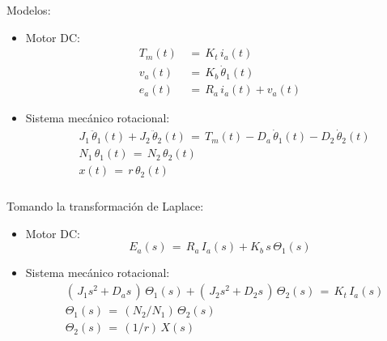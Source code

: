\documentclass[ 10pt, xcolor = dvipsnames]{beamer}
\begin{document}
\begin{frame}[allowframebreaks]
\frametitle{\insertsection}

Modelos: 
\begin{itemize}
\item Motor DC: 
\begin{align*}
T_m(t) \, & = \, K_t \, i_a(t) \\[1ex]
v_a(t) \, & = \, K_b \, \dot{\theta}_1(t) \\[1ex]
e_a(t) \, & = \, R_a \, i_a(t) + v_a(t)
\end{align*}
\item Sistema mec\'anico rotacional: 
\begin{align*}
& J_1 \, \ddot{\theta}_1(t) + J_2 \, \ddot{\theta}_2(t) 
\, = \, T_m(t) - D_a \, \dot{\theta}_1(t) - D_2 \, \dot{\theta}_2(t) \\[1ex]
& N_1 \, \theta_1(t) \, = \, N_2 \, \theta_2(t) \\[1ex]
& x(t) \, = \, r \, \theta_2(t)
\end{align*}
\end{itemize}

\end{frame}

\begin{frame}[allowframebreaks]
\frametitle{\insertsection}

Tomando la transformaci\'on de Laplace: 
\begin{itemize}
\item Motor DC: 
\[
E_a(s) \, = \, R_a \, I_a(s) + K_b \, s \, \Theta_1(s)
\]
\item Sistema mec\'anico rotacional: 
\begin{align*}
& ( \, J_1 s^2 + D_a s \, ) \, \Theta_1(s) + 
( \, J_2 s^2 + D_2 s \, ) \, \Theta_2(s) 
\, = \, K_t \, I_a(s) \\[1ex]
& \Theta_1(s) \, = \, ( N_2/N_1 ) \, \Theta_2(s) \\[1ex]
& \Theta_2(s) \, = \, (1/r) \, X(s)
\end{align*}
\end{itemize}

\end{frame}
\end{document}
